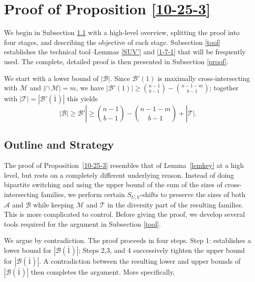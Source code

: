 \documentclass[11pt]{article}
\newcommand{\m}{\mathcal}
\begin{document}
\section{Proof of Proposition \ref{10-25-3}}\label{secpro3}
We begin in Subsection \ref{outline} with a high‑level overview, splitting the proof into four stages, and describing the objective of each stage. Subsection \ref{tool} establishes the technical tool--Lemmas \ref{SUV'} and \ref{1-7-1} that will be frequently used. The complete, detailed proof is then presented in Subsection \ref{proof}. 

We start with a lower bound of $|\mathcal{B}|$. 
Since $\mathcal{B}'(1)$ is maximally cross‑intersecting with $\mathcal{M}$ and $|\cap\, \mathcal{M}| = m$, 
we have $|\mathcal{B}'(1)| \ge \binom{n-1}{b-1} - \binom{n-1-m}{b-1}$; 
together with $|\mathcal{T}| = |\mathcal{B}'(\bar1)|$ this yields
\begin{equation}\label{lowerbound}
    |\m B|\ge \mathcal{B}'| \ge \binom{n-1}{b-1} - \binom{n-1-m}{b-1} + |\mathcal{T}|.
\end{equation}

\subsection{Outline and Strategy}\label{outline}
The proof of Proposition~\ref{10-25-3} resembles that of Lemma~\ref{lemkey} at a high level, but rests on a completely different underlying reason. Instead of doing bipartite switching and using the upper bound of the sum of the sizes of cross-intersecting families, we perform certain $S_{U,V}$-shifts to preserve the sizes of both $\m A$ and $\m B$ while keeping $\m M$ and $\m T$ in the diversity part of the resulting families. This is more complicated to control. Before giving the proof, we develop several tools required for the argument in Subsection \ref{tool}.

We argue by contradiction. The proof proceeds in four steps.
Step 1: establishes a lower bound for $|\m B(\bar1)|$;
Steps 2,3, and 4 successively tighten the upper bound for $|\m B(\bar1)|$.
A contradiction between the resulting lower and upper bounds of $|\m B(\bar1)|$ then completes the argument. More specifically, 
\end{document}
